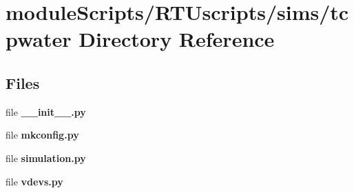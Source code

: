 \section{module\+Scripts/\+R\+T\+Uscripts/sims/tcpwater Directory Reference}
\label{dir_5159e9d51dfb71785a2e137b3fa698d4}
\subsection*{Files}
\begin{DoxyCompactItemize}
\item 
file {\bf \+\_\+\+\_\+init\+\_\+\+\_\+.\+py}
\item 
file {\bf mkconfig.\+py}
\item 
file {\bf simulation.\+py}
\item 
file {\bf vdevs.\+py}
\end{DoxyCompactItemize}
